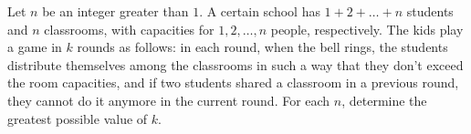 Let $n$ be an integer greater than $1$. A certain school has $1+2+\dots+n$ students and $n$ classrooms, with capacities for $1, 2, \dots, n$ people, respectively. The kids play a game in $k$ rounds as follows: in each round, when the bell rings, the students distribute themselves among the classrooms in such a way that they don't exceed the room capacities, and if two students shared a classroom in a previous round, they cannot do it anymore in the current round. For each $n$, determine the greatest possible value of $k$.

